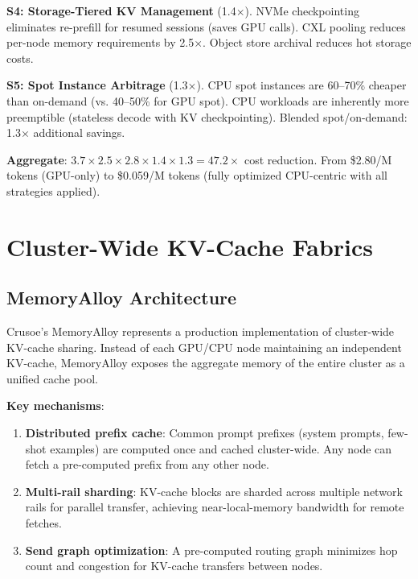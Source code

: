 \documentclass[conference,10pt]{IEEEtran}
\begin{document}
\textbf{S4: Storage-Tiered KV Management} (1.4$\times$). NVMe checkpointing eliminates re-prefill for resumed sessions (saves GPU calls). CXL pooling reduces per-node memory requirements by 2.5$\times$. Object store archival reduces hot storage costs.

\textbf{S5: Spot Instance Arbitrage} (1.3$\times$). CPU spot instances are 60--70\% cheaper than on-demand (vs. 40--50\% for GPU spot). CPU workloads are inherently more preemptible (stateless decode with KV checkpointing). Blended spot/on-demand: 1.3$\times$ additional savings.

\textbf{Aggregate}: $3.7 \times 2.5 \times 2.8 \times 1.4 \times 1.3 = 47.2\times$ cost reduction. From \$2.80/M tokens (GPU-only) to \$0.059/M tokens (fully optimized CPU-centric with all strategies applied).


\section{Cluster-Wide KV-Cache Fabrics}
\label{sec:memalloy}

\subsection{MemoryAlloy Architecture}

Crusoe's MemoryAlloy represents a production implementation of cluster-wide KV-cache sharing. Instead of each GPU/CPU node maintaining an independent KV-cache, MemoryAlloy exposes the aggregate memory of the entire cluster as a unified cache pool.

\textbf{Key mechanisms}:
\begin{enumerate}
\item \textbf{Distributed prefix cache}: Common prompt prefixes (system prompts, few-shot examples) are computed once and cached cluster-wide. Any node can fetch a pre-computed prefix from any other node.
\item \textbf{Multi-rail sharding}: KV-cache blocks are sharded across multiple network rails for parallel transfer, achieving near-local-memory bandwidth for remote fetches.
\item \textbf{Send graph optimization}: A pre-computed routing graph minimizes hop count and congestion for KV-cache transfers between nodes.
\end{enumerate}
\end{document}
